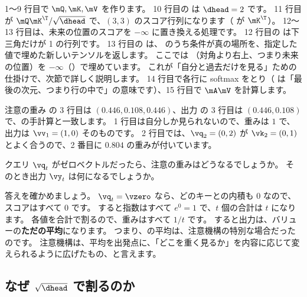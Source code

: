 1〜9 行目で $\mQ,\mK,\mV$ を作ります。
10 行目の  は $\dhead=2$ です。
11 行目が $\mQ\mK^\T/\sqrt{\dhead}$ で、$(3,3)$ のスコア行列になります（ が $\mK^\T$）。
12〜13 行目は、未来の位置のスコアを $-\infty$ に置き換える処理です。
12 行目の  は下三角だけが 1 の行列です。
13 行目の  は、 のうち条件が真の場所を、指定した値で埋めた新しいテンソルを返します。
ここでは （対角より右上、つまり未来の位置）を $-\infty$（）で埋めています。
これが「自分と過去だけを見る」ための仕掛けで、次節で詳しく説明します。
14 行目で各行に softmax をとり（ は「最後の次元、つまり行の中で」の意味です）、15 行目で $\mA\mV$ を計算します。


注意の重み  の 3 行目は $(0.446, 0.108, 0.446)$、出力  の 3 行目は $(0.446, 0.108)$ で、の手計算と一致します。
1 行目は自分しか見られないので、重みは $1$ で、出力は $\vv_1=(1,0)$ そのものです。
2 行目では、$\vq_2=(0,2)$ が $\vk_2=(0,1)$ とよく合うので、2 番目に $0.804$ の重みが付いています。

\begin{quiz}
クエリ $\vq_t$ がゼロベクトルだったら、注意の重みはどうなるでしょうか。
そのとき出力 $\vy_t$ は何になるでしょうか。
\end{quiz}

答えを確かめましょう。
$\vq_t=\vzero$ なら、どのキーとの内積も 0 なので、スコアはすべて 0 です。
すると指数はすべて $e^{0}=1$ で、$t$ 個の合計は $t$ になります。
各値を合計で割るので、重みはすべて $1/t$ です。
すると出力は、バリューの\textbf{ただの平均}になります。
つまり、の平均は、注意機構の特別な場合だったのです。
注意機構は、平均を出発点に、「どこを重く見るか」を内容に応じて変えられるように広げたもの、と言えます。

\subsection*{なぜ $\sqrt{\dhead}$ で割るのか}

